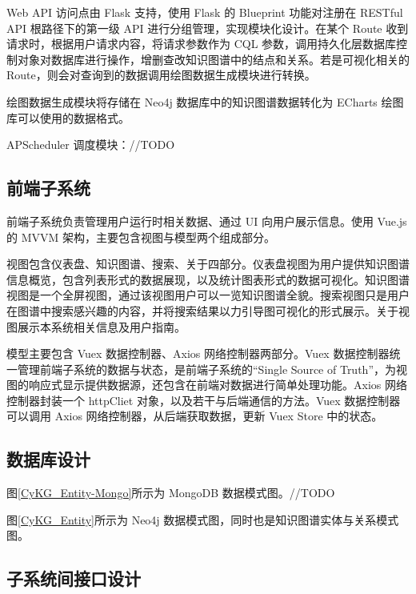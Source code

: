 \documentclass[a4paper,AutoFakeBold,oneside,12pt]{book}
\begin{document}
Web API 访问点由 Flask 支持，使用 Flask 的 Blueprint 功能对注册在 RESTful API 根路径下的第一级 API 进行分组管理，实现模块化设计。在某个 Route 收到请求时，根据用户请求内容，将请求参数作为 CQL 参数，调用持久化层数据库控制对象对数据库进行操作，增删查改知识图谱中的结点和关系。若是可视化相关的 Route，则会对查询到的数据调用绘图数据生成模块进行转换。

绘图数据生成模块将存储在 Neo4j 数据库中的知识图谱数据转化为 ECharts 绘图库可以使用的数据格式。

APScheduler 调度模块：//TODO

\subsection{前端子系统}

前端子系统负责管理用户运行时相关数据、通过 UI 向用户展示信息。使用 Vue.js 的 MVVM 架构，主要包含视图与模型两个组成部分。

视图包含仪表盘、知识图谱、搜索、关于四部分。仪表盘视图为用户提供知识图谱信息概览，包含列表形式的数据展现，以及统计图表形式的数据可视化。知识图谱视图是一个全屏视图，通过该视图用户可以一览知识图谱全貌。搜索视图只是用户在图谱中搜索感兴趣的内容，并将搜索结果以力引导图可视化的形式展示。关于视图展示本系统相关信息及用户指南。

模型主要包含 Vuex 数据控制器、Axios 网络控制器两部分。Vuex 数据控制器统一管理前端子系统的数据与状态，是前端子系统的“Single Source of Truth”，为视图的响应式显示提供数据源，还包含在前端对数据进行简单处理功能。Axios 网络控制器封装一个 httpCliet 对象，以及若干与后端通信的方法。Vuex 数据控制器可以调用 Axios 网络控制器，从后端获取数据，更新 Vuex Store 中的状态。

\subsection{数据库设计}

图\ref{CyKG_Entity-Mongo}所示为 MongoDB 数据模式图。//TODO


图\ref{CyKG_Entity}所示为 Neo4j 数据模式图，同时也是知识图谱实体与关系模式图。


\subsection{子系统间接口设计}
\end{document}
